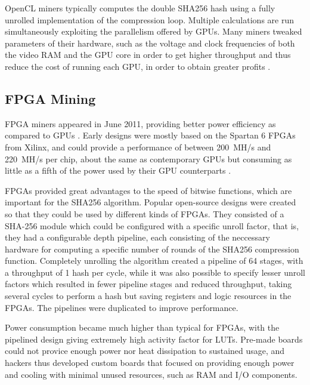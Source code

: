 OpenCL miners typically computes the double SHA256 hash using a fully unrolled implementation
of the compression loop. Multiple calculations are run simultaneously exploiting the parallelism
offered by GPUs. Many miners tweaked parameters of their hardware, such as the voltage and
clock frequencies of both the video RAM and the GPU core in order to get higher throughput
and thus reduce the cost of running each GPU, in order to obtain greater profits \cite{bespoke-silicon}.

\subsection{FPGA Mining}

FPGA miners appeared in June 2011, providing better power efficiency as compared to GPUs \cite{bespoke-silicon}.
Early designs were mostly based on the Spartan 6 FPGAs from Xilinx, and could provide a
performance of between 200~MH/s and 220~MH/s per chip, about the same as contemporary GPUs \cite{bitcoin-hardware-cmp}
but consuming as little as a fifth of the power used by their GPU counterparts \cite{bespoke-silicon}.


FPGAs provided great advantages to the speed of bitwise functions, which are important for
the SHA256 algorithm. Popular open-source designs were created so that they could be used
by different kinds of FPGAs. They consisted of a SHA-256 module which could be configured
with a specific unroll factor, that is, they had a configurable depth pipeline, each
consisting of the neccessary hardware for computing a specific number of rounds of the
SHA256 compression function. Completely unrolling the algorithm created a pipeline of
64 stages, with a throughput of 1 hash per cycle, while it was also possible to specify
lesser unroll factors which resulted in fewer pipeline stages and reduced throughput, taking
several cycles to perform a hash but saving registers and logic resources in the FPGAs.
The pipelines were duplicated to improve performance.

Power consumption became much higher than typical for FPGAs, with the pipelined design
giving extremely high activity factor for LUTs. Pre-made boards could not provice enough
power nor heat dissipation to sustained usage, and hackers thus developed custom
boards that focused on providing enough power and cooling with minimal unused resources,
such as RAM and I/O components. \cite{bespoke-silicon}


